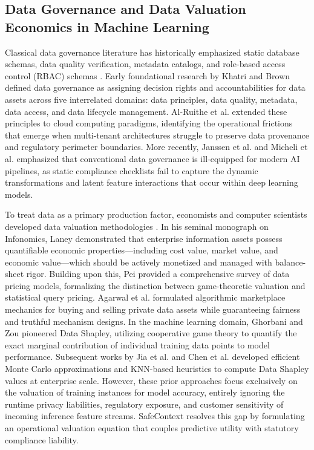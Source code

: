\documentclass[journal]{IEEEtran}
\begin{document}
\subsection{Data Governance and Data Valuation Economics in Machine Learning}
Classical data governance literature has historically emphasized static database schemas, data quality verification, metadata catalogs, and role-based access control (RBAC) schemas \cite{janssen2020data, al2017data, khatri2010designing}. Early foundational research by Khatri and Brown \cite{khatri2010designing} defined data governance as assigning decision rights and accountabilities for data assets across five interrelated domains: data principles, data quality, metadata, data access, and data lifecycle management. Al-Ruithe et al. \cite{al2017data} extended these principles to cloud computing paradigms, identifying the operational frictions that emerge when multi-tenant architectures struggle to preserve data provenance and regulatory perimeter boundaries. More recently, Janssen et al. \cite{janssen2020data} and Micheli et al. \cite{micheli2020emerging} emphasized that conventional data governance is ill-equipped for modern AI pipelines, as static compliance checklists fail to capture the dynamic transformations and latent feature interactions that occur within deep learning models.

To treat data as a primary production factor, economists and computer scientists developed data valuation methodologies \cite{pei2020survey, agarwal2019marketplace, laney2017infonomics}. In his seminal monograph on Infonomics, Laney \cite{laney2017infonomics} demonstrated that enterprise information assets possess quantifiable economic properties---including cost value, market value, and economic value---which should be actively monetized and managed with balance-sheet rigor. Building upon this, Pei \cite{pei2020survey} provided a comprehensive survey of data pricing models, formalizing the distinction between game-theoretic valuation and statistical query pricing. Agarwal et al. \cite{agarwal2019marketplace} formulated algorithmic marketplace mechanics for buying and selling private data assets while guaranteeing fairness and truthful mechanism designs. In the machine learning domain, Ghorbani and Zou \cite{ghorbani2019data} pioneered Data Shapley, utilizing cooperative game theory to quantify the exact marginal contribution of individual training data points to model performance. Subsequent works by Jia et al. \cite{jia2019towards} and Chen et al. \cite{chen2022data} developed efficient Monte Carlo approximations and KNN-based heuristics to compute Data Shapley values at enterprise scale. However, these prior approaches focus exclusively on the valuation of training instances for model accuracy, entirely ignoring the runtime privacy liabilities, regulatory exposure, and customer sensitivity of incoming inference feature streams. SafeContext resolves this gap by formulating an operational valuation equation that couples predictive utility with statutory compliance liability.
\end{document}
